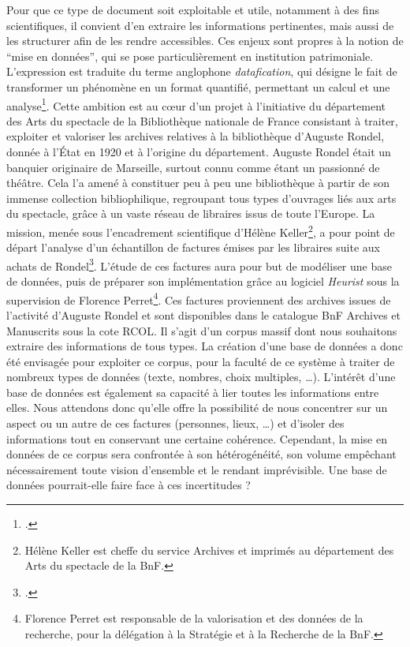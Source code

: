 \documentclass[12pt,twoside]{book}
\begin{document}
Pour que ce type de document soit exploitable et utile, notamment à des fins scientifiques, il convient d'en extraire les informations pertinentes, mais aussi de les structurer afin de les rendre accessibles. Ces enjeux sont propres à la notion de \enquote{mise en données}, qui se pose particulièrement en institution patrimoniale. L'expression est traduite du terme anglophone \emph{datafication}, qui désigne le fait de transformer un phénomène en un format quantifié, permettant un calcul et une analyse\footcite[p. 4]{clavert_2020}.  
Cette ambition est au cœur d'un projet à l'initiative du département des Arts du spectacle de la Bibliothèque nationale de France consistant à traiter, exploiter et valoriser les archives relatives à la bibliothèque d'Auguste Rondel, donnée à l'État en 1920 et à l'origine du département. Auguste Rondel était un banquier originaire de Marseille, surtout connu comme étant un passionné de théâtre. Cela l'a amené à constituer peu à peu une bibliothèque à partir de son immense collection bibliophilique, regroupant tous types d'ouvrages liés aux arts du spectacle, grâce à un vaste réseau de libraires issus de toute l'Europe. La mission, menée sous l'encadrement scientifique d'Hélène Keller\footnote{Hélène Keller est cheffe du service Archives et imprimés au département des Arts du spectacle de la BnF.}, a pour point de départ l'analyse d'un échantillon de factures émises par les libraires suite aux achats de Rondel\footcite{factures_rondel}. L'étude de ces factures aura pour but de modéliser une base de données, puis de préparer son implémentation grâce au logiciel \emph{Heurist} sous la supervision de Florence Perret\footnote{Florence Perret est responsable de la valorisation et des données de la recherche, pour la délégation à la Stratégie et à la Recherche de la BnF.
}. Ces factures proviennent des archives issues de l'activité d'Auguste Rondel et sont disponibles dans le catalogue BnF Archives et Manuscrits sous la cote RCOL. Il s'agit d'un corpus massif dont nous souhaitons extraire des informations de tous types. La création d'une base de données a donc été envisagée pour exploiter ce corpus, pour la faculté de ce système à traiter de nombreux types de données (texte, nombres, choix multiples, …).  
L'intérêt d'une base de données est également sa capacité à lier toutes les informations entre elles. Nous attendons donc qu'elle offre la possibilité de nous concentrer sur un aspect ou un autre de ces factures (personnes, lieux, …) et d'isoler des informations tout en conservant une certaine cohérence. Cependant, la mise en données de ce corpus sera confrontée à son hétérogénéité, son volume empêchant nécessairement toute vision d'ensemble et le rendant imprévisible. Une base de données pourrait-elle faire face à ces incertitudes ? 
\end{document}
